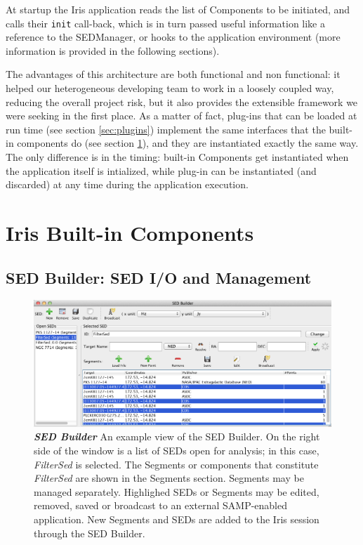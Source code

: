 \documentclass[5p]{elsarticle}
\begin{document}
At startup the Iris application reads the list of Components to be initiated, and calls their \verb|init| call-back, which is in turn passed useful information like a reference to the SEDManager, or hooks to the application environment (more information is provided in the following sections).

The advantages of this architecture are both functional and non functional: it helped our heterogeneous developing team to work in a loosely coupled way, reducing the overall project risk, but it also provides the extensible framework we were seeking in the first place. As a matter of fact, plug-ins that can be loaded at run time (see section \ref{sec:plugins}) implement the same interfaces that the built-in components do (see section \ref{sec:components}), and they are instantiated exactly the same way. The only difference is in the timing: built-in Components get instantiated when the application itself is intialized, while plug-in can be instantiated (and discarded) at any time during the application execution.

\section{Iris Built-in Components}
\label{sec:components}

\subsection{SED Builder: SED I/O and Management}

\begin{figure}
\begin{center}
\includegraphics[width=\columnwidth]{figures/sed_builder.png}
\caption{\textit{\textbf{\label{fig:sed_builder} SED Builder}} An example view of the SED Builder. On the right side of the window is a list of SEDs open for analysis; in this case, \textit{FilterSed} is selected. The Segments or components that constitute \textit{FilterSed} are shown in the Segments section. Segments may be managed separately. Highlighed SEDs or Segments may be edited, removed, saved or broadcast to an external SAMP-enabled application. New Segments and SEDs are added to the Iris session through the SED Builder. }
\end{center}
\end{figure}
\end{document}

